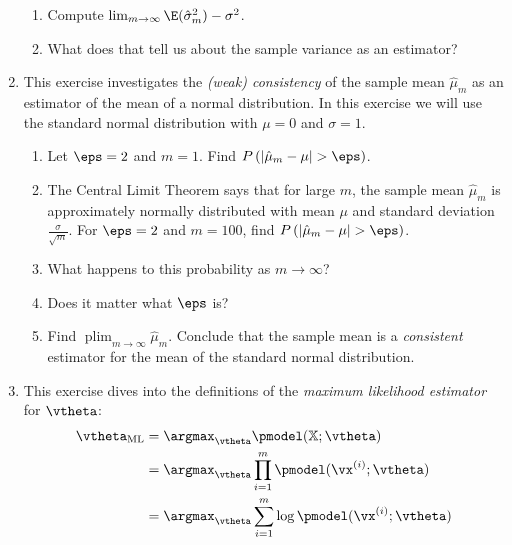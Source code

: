 \documentclass{article}
\DeclareMathOperator*{\plim}{plim}
\begin{document}
\begin{enumerate}
\begin{enumerate}
    \item Compute $\lim_{m\to\infty} \E(\hat{\sigma}_m^2) - \sigma^2$.
    \item What does that tell us about the sample variance as an estimator?
\end{enumerate}
    
\item \label{ML_ex_consistency} 
This exercise investigates the \emph{(weak) consistency} of the sample mean $\hat{\mu}_m$ as an estimator of the mean of a normal distribution. In this exercise we will use the standard normal distribution with $\mu = 0$ and $\sigma = 1$. 

\begin{enumerate}
    \item Let $\eps = 2$ and $m = 1$. Find $P\left(\lvert \hat{\mu}_m - \mu \rvert > \eps \right)$. 
    \item The Central Limit Theorem says that for large $m$, the sample mean $\hat{\mu}_m$ is approximately normally distributed with mean $\mu$ and standard deviation $\frac{\sigma}{\sqrt{m}}$. For $\eps = 2$ and $m = 100$, find $P\left(\lvert \hat{\mu}_m - \mu \rvert > \eps \right)$.
    \item What happens to this probability as $m \to \infty$? \item Does it matter what $\eps$ is?
    \item Find $\plim_{m\to\infty} \hat{\mu}_m$. Conclude that the sample mean is a \emph{consistent} estimator for the mean of the standard normal distribution. 
\end{enumerate}
    
\item \label{ML_ex_maximumlikelihood} 
This exercise dives into the definitions of the \emph{maximum likelihood estimator} for $\vtheta$:
\begin{align}
    \vtheta_\textnormal{ML} & = \argmax_\vtheta \pmodel(\mathbb{X}; \vtheta)                  \nonumber    \\
                           & = \argmax_\vtheta \prod_{i = 1}^m \pmodel(\vx^{(i)}; \vtheta)   \label{TMLdef1} \\
                           & = \argmax_\vtheta \sum_{i = 1}^m \log \pmodel(\vx^{(i)}; \vtheta)   \label{TMLdef2}
\end{align}


\end{enumerate}
\end{document}
